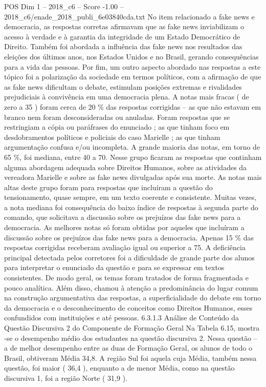 \begin{textsample}{POS Dim 1 – 2018\_c6 – Score -1.00 – 2018\_c6/enade\_2018\_publi\_6e03840cda.txt}
No item relacionado a fake news e democracia, as respostas corretas afirmavam que as fake news inviabilizam o acesso à verdade e à garantia da integridade de um Estado Democrático de Direito.
Também foi abordada a influência das fake news nos resultados das eleições dos últimos anos, nos Estados Unidos e no Brasil, gerando consequências para a vida das pessoas.
Por fim, um outro aspecto abordado nas respostas a este tópico foi a polarização da sociedade em termos políticos, com a afirmação de que as fake news dificultam o debate, estimulam posições extremas e rivalidades prejudiciais à convivência em uma democracia plena.
A notas mais fracas ( de zero a 35 ) foram cerca de 20 \% das respostas corrigidas – as que não estavam em branco nem foram desconsideradas ou anuladas.
Foram respostas que se restringiam a cópia ou paráfrases do enunciado ; as que tinham foco em desdobramentos políticos e policiais do caso Marielle ; as que tinham argumentação confusa e/ou incompleta.
A grande maioria das notas, em torno de 65 \%, foi mediana, entre 40 a 70.
Nesse grupo ficaram as respostas que continham alguma abordagem adequada sobre Direitos Humanos, sobre as atividades da vereadora Marielle e sobre as fake news divulgadas após sua morte.
As notas mais altas deste grupo foram para respostas que incluíram a questão do tensionamento, quase sempre, em um texto coerente e consistente.
Muitas vezes, a nota mediana foi consequência do baixo índice de respostas à segunda parte do comando, que solicitava a discussão sobre os prejuízos das fake news para a democracia.
As melhores notas só foram obtidas por aqueles que incluíram a discussão sobre os prejuízos das fake news para a democracia.
Apenas 15 \% das respostas corrigidas receberam avaliação igual ou superior a 75.
A deficiência principal detectada pelos corretores foi a dificuldade de grande parte dos alunos para interpretar o enunciado da questão e para se expressar em textos consistentes.
De modo geral, os temas foram tratados de forma fragmentada e pouco analítica.
Além disso, chamou à atenção a predominância do lugar comum na construção argumentativa das respostas, a superficialidade do debate em torno da democracia e o desconhecimento de conceitos como Direitos Humanos, esses confundidos com instituições e até pessoas. 6.3.1.3 Análise de Conteúdo da Questão Discursiva 2 do Componente de Formação Geral Na Tabela 6.15, mostra -se o desempenho médio dos estudantes na questão discursiva 2.
Nessa questão – a de melhor desempenho entre as duas de Formação Geral, os alunos de todo o Brasil, obtiveram Média 34,8.
A região Sul foi aquela cuja Média, também nessa questão, foi maior ( 36,4 ), enquanto a de menor Média, como na questão discursiva 1, foi a região Norte ( 31,9 ).

\end{textsample}

